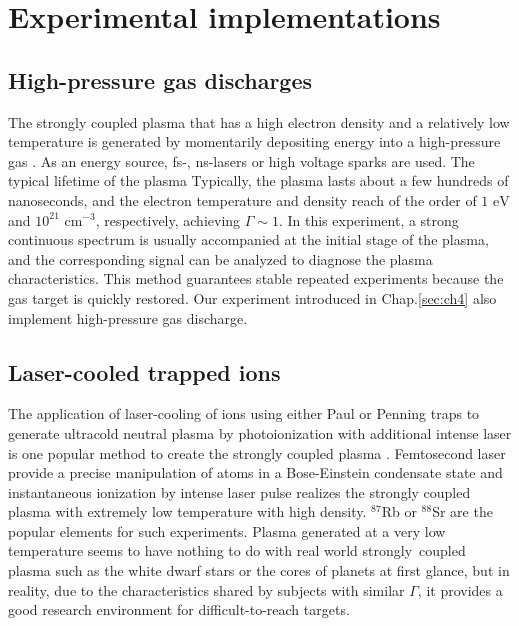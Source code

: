 \section{Experimental implementations}
\label{sec:ch3-3}

\subsection{High-pressure gas discharges}
\label{sec:ch3-3-1}

The strongly coupled plasma that has a high electron density and a relatively low temperature is generated by momentarily depositing energy into a high-pressure gas \cite{tsuda2000calculation, harilal2004spatial, bataller2014blackbody, bataller2016observation}. As an energy source, fs-, ns-lasers or high voltage sparks are used. The typical lifetime of the plasma  Typically, the plasma lasts about a few hundreds of nanoseconds, and the electron temperature and density reach of the order of $1 \text{ eV}$ and $10^{21} \text{ cm}^{-3}$, respectively, achieving $\Gamma \sim 1$. In this experiment, a strong continuous spectrum is usually accompanied at the initial stage of the plasma, and the corresponding signal can be analyzed to diagnose the plasma characteristics. This method guarantees stable repeated experiments because the gas target is quickly restored. Our experiment introduced in Chap.\ref{sec:ch4} also implement high-pressure gas discharge.

\subsection{Laser-cooled trapped ions}
\label{sec:ch3-3-2}

The application of laser-cooling of ions using either Paul \cite{diedrich1987observation, drewsen1998large} or Penning traps \cite{dubin1999trapped} to generate ultracold neutral plasma by photoionization with additional intense laser is one popular method to create the strongly coupled plasma \cite{murillo2004strongly, langin2019laser, kroker2020ultrafast}. Femtosecond laser provide a precise manipulation of atoms in a Bose-Einstein condensate state and instantaneous ionization by intense laser pulse realizes the strongly coupled plasma with extremely low temperature with high density. $^{87}$Rb or $^{88}$Sr are the popular elements for such experiments. Plasma generated at a very low temperature seems to have nothing to do with real world strongly coupled plasma such as the white dwarf stars or the cores of planets at first glance, but in reality, due to the characteristics shared by subjects with similar $\Gamma$, it provides a good research environment for difficult-to-reach targets.

